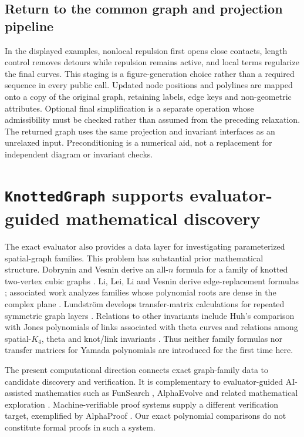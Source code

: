 \documentclass[10pt,twocolumn]{article}
\begin{document}
\subsection{Return to the common graph and projection pipeline}
\label{supp:repulsive_return}
In the displayed examples, nonlocal repulsion first opens close contacts, length control removes detours while repulsion remains active, and local terms regularize the final curves. This staging is a figure-generation choice rather than a required sequence in every public call. Updated node positions and polylines are mapped onto a copy of the original graph, retaining labels, edge keys and non-geometric attributes. Optional final simplification is a separate operation whose admissibility must be checked rather than assumed from the preceding relaxation. The returned graph uses the same projection and invariant interfaces as an unrelaxed input. Preconditioning is a numerical aid, not a replacement for independent diagram or invariant checks.
\FloatBarrier

\section{\texttt{KnottedGraph} supports evaluator-guided mathematical discovery}
\label{supp:transfer_derivation}
The exact evaluator also provides a data layer for investigating parameterized spatial-graph families. This problem has substantial prior mathematical structure. Dobrynin and Vesnin derive an all-$n$ formula for a family of knotted two-vertex cubic graphs \cite{kg_dobrynin1996yamada}. Li, Lei, Li and Vesnin derive edge-replacement formulas \cite{kg_li2018yamada}; associated work analyzes families whose polynomial roots are dense in the complex plane \cite{kg_li2019density}. Lundstr\"om develops transfer-matrix calculations for repeated symmetric graph layers \cite{kg_lundstrom2022transfer}. Relations to other invariants include Huh's comparison with Jones polynomials of links associated with theta curves \cite{kg_huh2024theta} and relations among spatial-$K_4$, theta and knot/link invariants \cite{kg_vesnin2025complete}. Thus neither family formulas nor transfer matrices for Yamada polynomials are introduced for the first time here.

The present computational direction connects exact graph-family data to candidate discovery and verification. It is complementary to evaluator-guided AI-assisted mathematics such as FunSearch \cite{kg_funsearch2024}, AlphaEvolve \cite{kg_alphaevolve2025} and related mathematical exploration \cite{kg_georgiev2025mathematical}. Machine-verifiable proof systems supply a different verification target, exemplified by AlphaProof \cite{kg_alphaproof2026}. Our exact polynomial comparisons do not constitute formal proofs in such a system.
\end{document}
